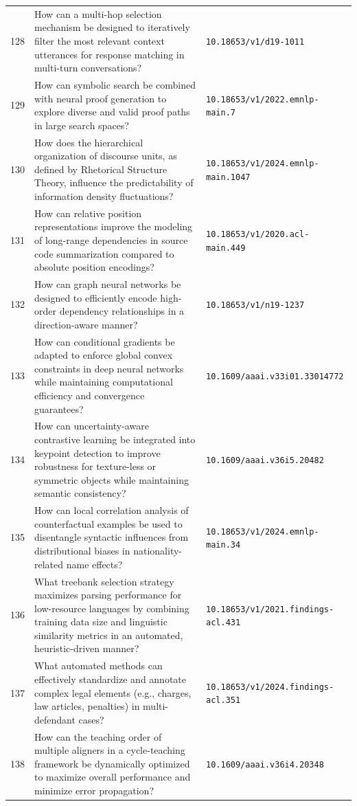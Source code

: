 \documentclass[runningheads]{llncs}
\begin{document}
\begin{longtable}{@{}p{0.5cm}p{7.2cm}p{2.5cm}@{}}
128 & How can a multi-hop selection mechanism be designed to iteratively filter the most relevant context utterances for response matching in multi-turn conversations? & \texttt{10.18653/v1/d19-1011} \\
129 & How can symbolic search be combined with neural proof generation to explore diverse and valid proof paths in large search spaces? & \texttt{10.18653/v1/2022.emnlp-main.7} \\
130 & How does the hierarchical organization of discourse units, as defined by Rhetorical Structure Theory, influence the predictability of information density fluctuations? & \texttt{10.18653/v1/2024.emnlp-main.1047} \\
131 & How can relative position representations improve the modeling of long-range dependencies in source code summarization compared to absolute position encodings? & \texttt{10.18653/v1/2020.acl-main.449} \\
132 & How can graph neural networks be designed to efficiently encode high-order dependency relationships in a direction-aware manner? & \texttt{10.18653/v1/n19-1237} \\
133 & How can conditional gradients be adapted to enforce global convex constraints in deep neural networks while maintaining computational efficiency and convergence guarantees? & \texttt{10.1609/aaai.v33i01.33014772} \\
134 & How can uncertainty-aware contrastive learning be integrated into keypoint detection to improve robustness for texture-less or symmetric objects while maintaining semantic consistency? & \texttt{10.1609/aaai.v36i5.20482} \\
135 & How can local correlation analysis of counterfactual examples be used to disentangle syntactic influences from distributional biases in nationality-related name effects? & \texttt{10.18653/v1/2024.emnlp-main.34} \\
136 & What treebank selection strategy maximizes parsing performance for low-resource languages by combining training data size and linguistic similarity metrics in an automated, heuristic-driven manner? & \texttt{10.18653/v1/2021.findings-acl.431} \\
137 & What automated methods can effectively standardize and annotate complex legal elements (e.g., charges, law articles, penalties) in multi-defendant cases? & \texttt{10.18653/v1/2024.findings-acl.351} \\
138 & How can the teaching order of multiple aligners in a cycle-teaching framework be dynamically optimized to maximize overall performance and minimize error propagation? & \texttt{10.1609/aaai.v36i4.20348} \\

\end{longtable}
\end{document}
